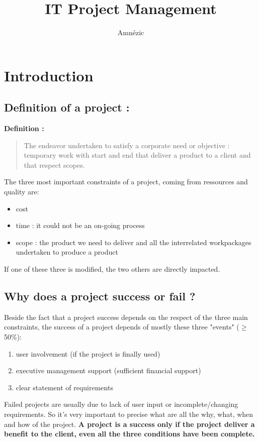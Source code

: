 \documentclass{article}
\author{Amnézic}
\date{}
\title{IT Project Management}
\begin{document}
\maketitle
\newpage
\tableofcontents
\newpage

\section{Introduction}

\subsection{Definition of a project :}
\textbf{Definition :}
\begin{quote}
	The endeavor undertaken to satisfy a corporate need or objective : temporary work with start and end that deliver a product to a client and that respect scopes.
\end{quote}

The three most important constraints of a project, coming from ressources and quality are:
\begin{itemize}
	\item cost
	\item time : it could not be an on-going process
	\item scope : the product we need to deliver and all the interrelated workpackages undertaken to produce a product
\end{itemize}
If one of these three is modified, the two others are directly impacted. \newline

\subsection{Why does a project success or fail ?}
Beside the fact that a project success depends on the respect of the three main constraints, the success of a project depends of mostly these three "events" ($\geq$50\%):
\begin{enumerate}
    \item user involvement (if the project is finally used)
    \item executive management support (sufficient financial support)
    \item clear statement of requirements
\end{enumerate}

Failed projects are usually due to lack of user input or incomplete/changing requirements. So it's very important to precise what are all the why, what, when and how of the project. \textbf{A project is a success only if the project deliver a benefit to the client, even all the three conditions have been complete.}
\end{document}
